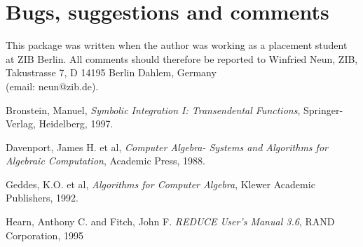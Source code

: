 \section{Bugs, suggestions and comments}
This package was written when the author was working as a placement student at ZIB Berlin. All comments should therefore be reported to Winfried Neun, ZIB, Takustrasse 7, D 14195 Berlin Dahlem, Germany \\ (email: neun@zib.de).

\pagebreak

\begin{thebibliography}{999999} 
\normalsize
{} Bronstein, Manuel,
{\it Symbolic Integration I: Transendental Functions},
Springer-Verlag, Heidelberg, 1997.

 Davenport, James H. et al,
{\it Computer Algebra- Systems and Algorithms for Algebraic Computation},
Academic Press, 1988.

 Geddes, K.O. et al,
{\it Algorithms for Computer Algebra}, Klewer Academic \mbox{Publishers}, 1992.

 Hearn, Anthony C. and Fitch, John F.
{\it REDUCE User's Manual 3.6}, RAND Corporation, 1995
\end{thebibliography}






























































